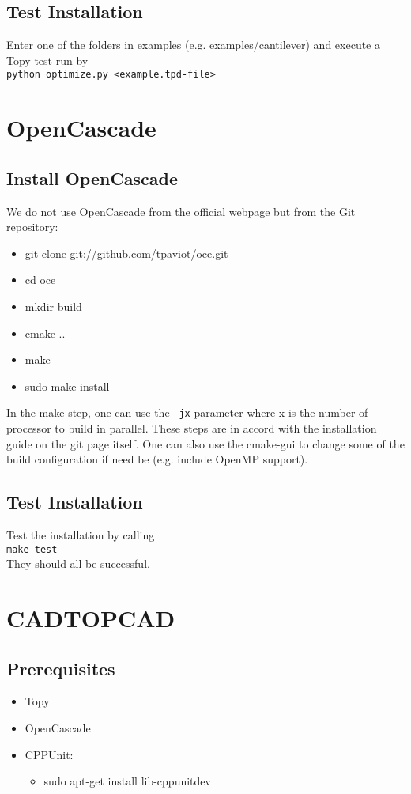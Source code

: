 \documentclass[11pt,a4paper,bibtotoc,idxtotoc,headsepline,footsepline,footexclude,DIV13,oneside]{scrbook}
\begin{document}
	\section{Test Installation}
	Enter one of the folders in examples (e.g. examples/cantilever) and execute a Topy test run by \\
	\texttt{python optimize.py <example.tpd-file>}\\
	
	\chapter{OpenCascade}
	\section{Install OpenCascade}
	We do not use OpenCascade from the official webpage but from the Git repository:
	\begin{itemize}
	\item git clone git://github.com/tpaviot/oce.git
	\item cd oce
	\item mkdir build
	\item cmake ..
	\item make 
	\item sudo make install
	\end{itemize}
	In the make step, one can use the \texttt{-jx} parameter where x is the number of processor to build in parallel. These steps are in accord with the installation guide on the git page itself. One can also use the cmake-gui to change some of the build configuration if need be (e.g. include OpenMP support).
	\section{Test Installation}
	Test the installation by calling \\
	\texttt{make test}\\
	They should all be successful.
	
	\chapter{CADTOPCAD}
	\section{Prerequisites}
	\begin{itemize}
	\item Topy
	\item OpenCascade
	\item CPPUnit:
		\begin{itemize}
		\item sudo apt-get install lib-cppunitdev
		\end{itemize}
	\end{itemize}

  	\clearemptydoublepage
	
 
\end{document}
